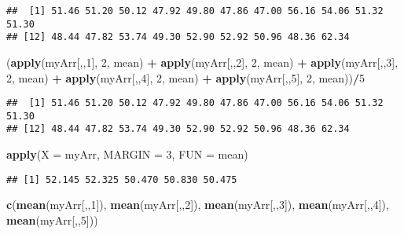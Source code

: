 \documentclass[]{book}
\newenvironment{Shaded}{\begin{snugshade}}{\end{snugshade}}
\newcommand{\KeywordTok}[1]{\textcolor[rgb]{0.13,0.29,0.53}{\textbf{#1}}}
\newcommand{\DataTypeTok}[1]{\textcolor[rgb]{0.13,0.29,0.53}{#1}}
\newcommand{\DecValTok}[1]{\textcolor[rgb]{0.00,0.00,0.81}{#1}}
\newcommand{\StringTok}[1]{\textcolor[rgb]{0.31,0.60,0.02}{#1}}
\newcommand{\OperatorTok}[1]{\textcolor[rgb]{0.81,0.36,0.00}{\textbf{#1}}}
\newcommand{\NormalTok}[1]{#1}
\theoremstyle{definition}
\theoremstyle{definition}
\theoremstyle{definition}
\theoremstyle{remark}
\begin{document}
\begin{verbatim}
##  [1] 51.46 51.20 50.12 47.92 49.80 47.86 47.00 56.16 54.06 51.32 51.30
## [12] 48.44 47.82 53.74 49.30 52.90 52.92 50.96 48.36 62.34
\end{verbatim}

\begin{Shaded}
\begin{Highlighting}[]
\NormalTok{(}\KeywordTok{apply}\NormalTok{(myArr[,,}\DecValTok{1}\NormalTok{], }\DecValTok{2}\NormalTok{, mean) }\OperatorTok{+}\StringTok{ }\KeywordTok{apply}\NormalTok{(myArr[,,}\DecValTok{2}\NormalTok{], }\DecValTok{2}\NormalTok{, mean) }\OperatorTok{+}\StringTok{ }
\StringTok{  }\KeywordTok{apply}\NormalTok{(myArr[,,}\DecValTok{3}\NormalTok{], }\DecValTok{2}\NormalTok{, mean) }\OperatorTok{+}\StringTok{ }\KeywordTok{apply}\NormalTok{(myArr[,,}\DecValTok{4}\NormalTok{], }\DecValTok{2}\NormalTok{, mean) }\OperatorTok{+}\StringTok{ }
\StringTok{  }\KeywordTok{apply}\NormalTok{(myArr[,,}\DecValTok{5}\NormalTok{], }\DecValTok{2}\NormalTok{, mean))}\OperatorTok{/}\DecValTok{5}
\end{Highlighting}
\end{Shaded}

\begin{verbatim}
##  [1] 51.46 51.20 50.12 47.92 49.80 47.86 47.00 56.16 54.06 51.32 51.30
## [12] 48.44 47.82 53.74 49.30 52.90 52.92 50.96 48.36 62.34
\end{verbatim}

\begin{Shaded}
\begin{Highlighting}[]
\KeywordTok{apply}\NormalTok{(}\DataTypeTok{X =}\NormalTok{ myArr, }\DataTypeTok{MARGIN =} \DecValTok{3}\NormalTok{, }\DataTypeTok{FUN =}\NormalTok{ mean)}
\end{Highlighting}
\end{Shaded}

\begin{verbatim}
## [1] 52.145 52.325 50.470 50.830 50.475
\end{verbatim}

\begin{Shaded}
\begin{Highlighting}[]
\KeywordTok{c}\NormalTok{(}\KeywordTok{mean}\NormalTok{(myArr[,,}\DecValTok{1}\NormalTok{]), }\KeywordTok{mean}\NormalTok{(myArr[,,}\DecValTok{2}\NormalTok{]), }\KeywordTok{mean}\NormalTok{(myArr[,,}\DecValTok{3}\NormalTok{]), }
  \KeywordTok{mean}\NormalTok{(myArr[,,}\DecValTok{4}\NormalTok{]), }\KeywordTok{mean}\NormalTok{(myArr[,,}\DecValTok{5}\NormalTok{]))}
\end{Highlighting}
\end{Shaded}
\end{document}
